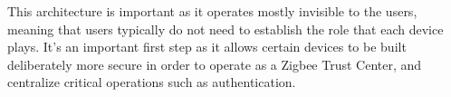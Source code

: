 This architecture is important as it operates mostly invisible to the users, meaning that users typically do not need to establish the role that each device plays. It’s an important first step as it allows certain devices to be built deliberately more secure in order to operate as a Zigbee Trust Center, and centralize critical operations such as authentication.
